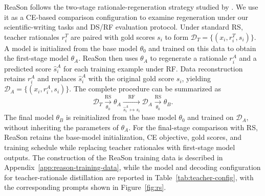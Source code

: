 ReaSon follows the two-stage rationale-regeneration strategy studied by
\citet{chiang-etal-2025-tract}. We use it as a CE-based comparison
configuration to examine regeneration under our scientific-writing tasks
and DS/RF evaluation protocol.
Under standard RS, teacher rationales \(r_i^T\) are paired with gold
scores \(s_i\) to form
\(\mathcal{D}_T=\{(x_i,r_i^T,s_i)\}\). A model is initialized from the
base model \(\theta_0\) and trained on this data to obtain the
first-stage model \(\theta_A\). ReaSon then uses \(\theta_A\) to
regenerate a rationale \(r_i^A\) and a predicted score
\(\hat{s}_i^A\) for each training example under RF. Data reconstruction
retains \(r_i^A\) and replaces \(\hat{s}_i^A\) with the original gold
score \(s_i\), yielding
\(\mathcal{D}_A=\{(x_i,r_i^A,s_i)\}\). The complete procedure can be summarized as
\[
\mathcal{D}_T
\xrightarrow[\theta_0]{\mathrm{RS}}
\theta_A
\xrightarrow[\hat{s}_i^A\mapsto s_i]{\mathrm{RF}}
\mathcal{D}_A
\xrightarrow[\theta_0]{\mathrm{RS}}
\theta_B .
\]
The final model \(\theta_B\) is reinitialized from the base model
\(\theta_0\) and trained on \(\mathcal{D}_A\), without inheriting the
parameters of \(\theta_A\). For the final-stage comparison with RS,
ReaSon retains the base-model initialization, CE objective, gold scores,
and training schedule while replacing teacher rationales with first-stage
model outputs. The construction of the ReaSon training data is described in
Appendix~\ref{app:reason-training-data}, while the model and decoding configuration
for teacher-rationale distillation are reported in
Table~\ref{tab:teacher-config}, with the corresponding prompts shown in
Figure~\ref{fig:rs}.

%
%


